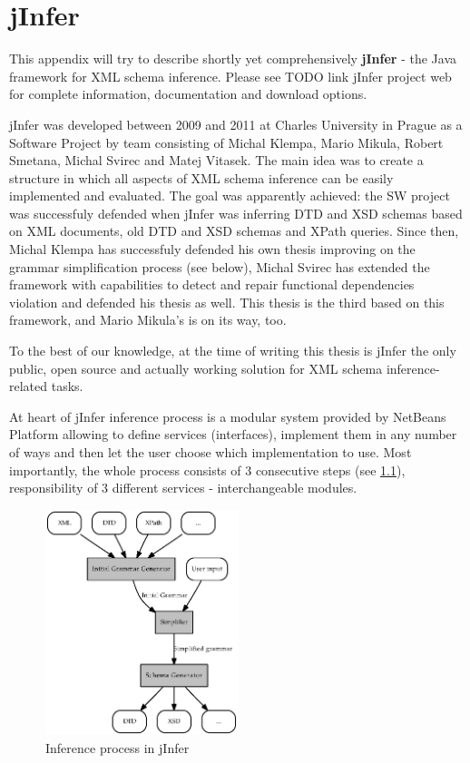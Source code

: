 \documentclass[a4paper,12pt,oneside]{report}
\theoremstyle{definition}
\let\openright=\clearpage
\begin{document}
\appendix

\openright
{}

\chapter{jInfer}
\label{appendix-jInfer}

This appendix will try to describe shortly yet comprehensively \textbf{jInfer} - the Java framework for XML schema inference. Please see TODO link jInfer project web for complete information, documentation and download options.

jInfer was developed between 2009 and 2011 at Charles University in Prague as a Software Project by team consisting of Michal Klempa, Mario Mikula, Ro\-bert Sme\-ta\-na, Michal Svirec and Matej Vitasek. The main idea was to create a structure in which all aspects of XML schema inference can be easily implemented and evaluated. The goal was apparently achieved: the SW project was successfuly defended when jInfer was inferring DTD and XSD schemas based on XML documents, old DTD and XSD schemas and XPath queries. Since then, Michal Klempa has successfuly defended his own thesis improving on the grammar simplification process (see below), Michal Svirec has extended the framework with capabilities to detect and repair functional dependencies violation and defended his thesis as well. This thesis is the third based on this framework, and Mario Mikula's is on its way, too.

To the best of our knowledge, at the time of writing this thesis is jInfer the only public, open source and actually working solution for XML schema inference-related tasks.

At heart of jInfer inference process is a modular system provided by NetBeans Platform allowing to define services (interfaces), implement them in any number of ways and then let the user choose which implementation to use. Most importantly, the whole process consists of 3 consecutive steps (see \ref{image-inference-process}), responsibility of 3 different services - interchangeable modules.

\begin{figure}
  \caption{Inference process in jInfer}
  \label{image-inference-process}
  \centering
    \includegraphics[width=0.5\textwidth]{images/inference-process}
\end{figure}
\end{document}

